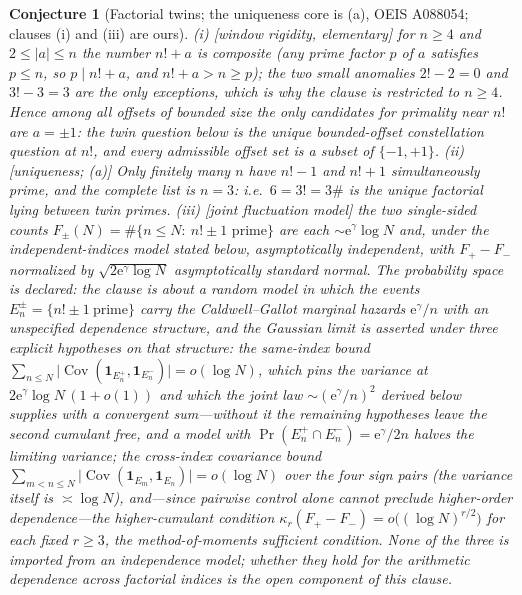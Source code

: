 \documentclass[11pt]{article}
\newtheorem{conjecture}{Conjecture}
\theoremstyle{definition}
\newcommand{\e}{\mathrm{e}}
\begin{document}
\setcounter{conjecture}{20}%
\begin{conjecture}[Factorial twins; the uniqueness core is (a), OEIS
A088054; clauses (i) and (iii) are ours]\label{c10}
\emph{(i)} [window rigidity, elementary] for $n\ge4$ and
$2\le|a|\le n$ the number $n!+a$ is composite (any prime factor $p$
of $a$ satisfies $p\le n$, so $p\mid n!+a$, and $n!+a>n\ge p$); the
two small anomalies $2!-2=0$ and $3!-3=3$ are the only exceptions,
which is why the clause is restricted to $n\ge4$.  Hence among all offsets
of bounded size the only
candidates for primality near $n!$ are $a=\pm1$: the twin question
below is the \emph{unique} bounded-offset constellation question at
$n!$, and every admissible offset set is a subset of $\{-1,+1\}$.
\emph{(ii)} [uniqueness; (a)] Only finitely many $n$ have $n!-1$ and
$n!+1$ simultaneously prime, and the complete list is $n=3$: i.e.\
$6=3!=3\#$ is the unique factorial lying between twin primes.
\emph{(iii)} [joint fluctuation model] the two single-sided counts
$F_{\pm}(N)=\#\{n\le N:\ n!\pm1 \text{ prime}\}$ are each
$\sim\e^{\gamma}\log N$ and, \emph{under the independent-indices
model stated below}, asymptotically independent, with
$F_{+}-F_{-}$ normalized by $\sqrt{2\e^{\gamma}\log N}$
asymptotically standard normal.  The probability space is declared:
the clause is about a random model in which the events
$E_n^{\pm}=\{n!\pm1\ \text{prime}\}$ carry the Caldwell--Gallot
marginal hazards $\e^{\gamma}/n$ with an \emph{unspecified}
dependence structure, and the Gaussian limit is asserted under three explicit hypotheses on that structure: the same-index bound $\sum_{n\le N}\bigl|\operatorname{Cov}(\mathbf 1_{E_n^+},\mathbf 1_{E_n^-})\bigr|=o(\log N)$, which pins the variance at $2\e^{\gamma}\log N\,(1+o(1))$ and which the joint law $\sim(\e^{\gamma}/n)^2$ derived below supplies with a convergent sum---without it the remaining hypotheses leave the second cumulant free, and a model with $\Pr(E_n^+\cap E_n^-)=\e^{\gamma}/2n$ halves the limiting variance; the cross-index covariance bound
$\sum_{m<n\le N}\bigl|\operatorname{Cov}(\mathbf 1_{E_m},
\mathbf 1_{E_n})\bigr|=o(\log N)$ over the four sign pairs (the
variance itself is $\asymp\log N$), \emph{and}---since pairwise
control alone cannot preclude higher-order dependence---the
higher-cumulant condition
$\kappa_r(F_+-F_-)=o\bigl((\log N)^{r/2}\bigr)$ for each fixed
$r\ge3$, the method-of-moments sufficient condition.  None of the three is imported from an independence model; whether they hold for the
arithmetic dependence across
factorial indices is the open
component of this clause.
\end{conjecture}
\end{document}
